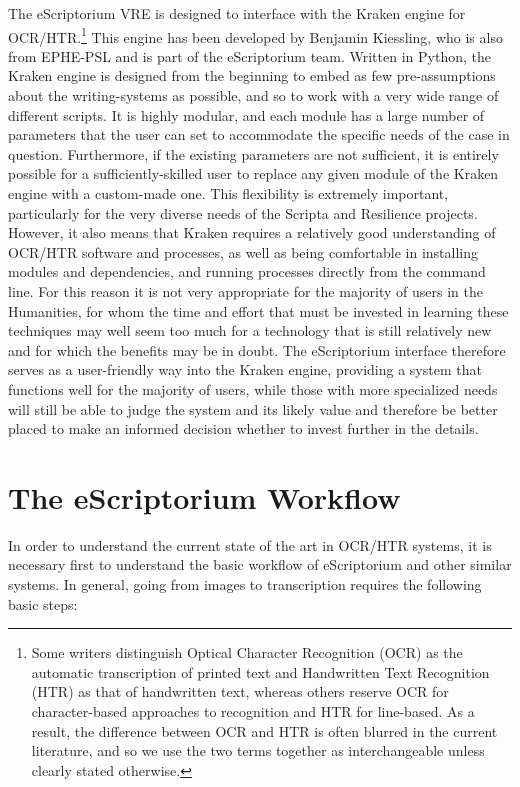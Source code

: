 The eScriptorium VRE is designed to interface with the Kraken engine for
OCR/HTR.\footnote{Some writers distinguish Optical Character Recognition (OCR)
as the automatic transcription of printed text and Handwritten Text Recognition
(HTR) as that of handwritten text, whereas others reserve OCR for
character-based approaches to recognition and HTR for line-based. As a result,
the difference between OCR and HTR is often blurred in the current literature,
and so we use the two terms together as interchangeable unless clearly stated
otherwise.} This engine has been developed by Benjamin Kiessling, who is also
from EPHE-PSL and is part of the eScriptorium team. Written in Python, the
Kraken engine is designed from the beginning to embed as few pre-assumptions
about the writing-systems as possible, and so to work with a very wide range of
different scripts. It is highly modular, and each module has a large number of
parameters that the user can set to accommodate the specific needs of the case
in question. Furthermore, if the existing parameters are not sufficient, it is
entirely possible for a sufficiently-skilled user to replace any given module
of the Kraken engine with a custom-made one. This flexibility is extremely
important, particularly for the very diverse needs of the Scripta and
Resilience projects. However, it also means that Kraken requires a relatively
good understanding of OCR/HTR software and processes, as well as being
comfortable in installing modules and dependencies, and running processes
directly from the command line. For this reason it is not very appropriate for
the majority of users in the Humanities, for whom the time and effort that must
be invested in learning these techniques may well seem too much for a
technology that is still relatively new and for which the benefits may be in
doubt. The eScriptorium interface therefore serves as a user-friendly way into
the Kraken engine, providing a system that functions well for the majority of
users, while those with more specialized needs will still be able to judge the
system and its likely value and therefore be better placed to make an informed
decision whether to invest further in the details.

\section{The eScriptorium Workflow}

In order to understand the current state of the art in OCR/HTR systems, it is
necessary first to understand the basic workflow of eScriptorium and other
similar systems. In general, going from images to transcription requires
the following basic steps:

